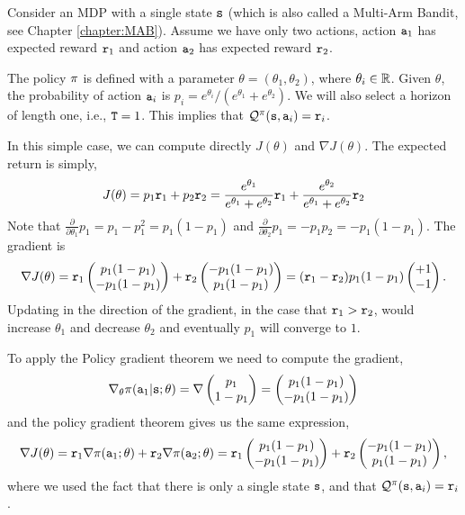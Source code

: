 \begin{example}\label{example:mab_pg}
Consider an MDP with a single state ${\tt s}$ (which is also called a
Multi-Arm Bandit, see
Chapter \ref{chapter:MAB}).
Assume we have only two actions, action ${\tt a}_1$ has expected
reward ${\tt r}_1$ and action ${\tt a}_2$ has expected reward
${\tt r}_2$.

The policy $\pi$ is defined with a parameter
$\theta=(\theta_1,\theta_2)$, where $\theta_i\in \mathbb{R}$. Given
$\theta$, the probability of action ${\tt a}_i$ is
$p_i=e^{\theta_i}/(e^{\theta_1}+e^{\theta_2})$. We will also select
a horizon of length one, i.e., ${\tt T}=1$. This implies that
$\mathcal{Q}^\pi({\tt s},{\tt a}_i)={\tt r}_i$.

In this simple case, we can compute directly $J(\theta)$ and $\nabla
J(\theta)$. The expected return is simply,
\[
J(\theta)=p_1 {\tt r}_1 + p_2 {\tt r}_2 =
\frac{e^{\theta_1}}{e^{\theta_1}+e^{\theta_2}} {\tt r}_1 +
\frac{e^{\theta_2}}{e^{\theta_1}+e^{\theta_2}} {\tt r}_2
\]
Note that $\frac{\partial}{\partial \theta_1} p_1=
p_1-p_1^2=p_1(1-p_1) $ and $\frac{\partial }{\partial \theta_2} p_1=
- p_1 p_2= -p_1(1-p_1)$. The gradient is
\[
\nabla J(\theta)= {\tt r}_1 \begin{pmatrix} p_1(1-p_1)\\
-p_1(1-p_1)\end{pmatrix} + {\tt r}_2 \begin{pmatrix} -p_1(1-p_1)\\
p_1(1-p_1)\end{pmatrix} = ({\tt r}_1-{\tt r}_2) p_1(1-p_1) \begin{pmatrix}+1\\
-1\end{pmatrix}.
\]
Updating in the direction of the gradient, in the case that
${\tt r}_1>{\tt r}_2$, would increase $\theta_1$ and decrease
$\theta_2$ and eventually $p_1$ will converge to $1$.

To apply the Policy gradient theorem we need to compute the
gradient,
\[
\nabla_\theta \pi({\tt a}_1|{\tt s};\theta) = \nabla \begin{pmatrix} p_1\\
1-p_1\end{pmatrix}=  \begin{pmatrix} p_1(1-p_1)\\
-p_1(1-p_1)\end{pmatrix}
\]
and the policy gradient theorem gives us the same expression,
\[
\nabla J(\theta) = {\tt r}_1 \nabla
\pi({\tt a}_1;\theta)+{\tt r}_2 \nabla
\pi({\tt a}_2;\theta)={\tt r}_1 \begin{pmatrix} p_1(1-p_1)\\
-p_1(1-p_1)\end{pmatrix} + {\tt r}_2 \begin{pmatrix} -p_1(1-p_1)\\
p_1(1-p_1)\end{pmatrix},
\]
where we used the fact that there is only a single state ${\tt s}$,
and that $\mathcal{Q}^\pi({\tt s},{\tt a}_i)={\tt r}_i$.
\end{example}

